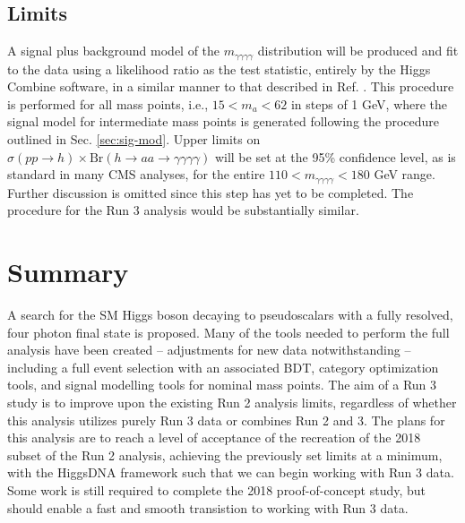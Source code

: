 \documentclass[12pt]{article}
\begin{document}
\subsection{Limits}
A signal plus background model of the $m_{\gamma\gamma\gamma\gamma}$ distribution will be produced and fit to the data using a likelihood ratio as the test statistic, entirely by the Higgs Combine software, in a similar manner to that described in Ref. \cite{higgs-search-2012}. This procedure is performed for all mass points, i.e., $15 < m_{a} < 62$ in steps of 1 GeV, where the signal model for intermediate mass points is generated following the procedure outlined in Sec. \ref{sec:sig-mod}. Upper limits on $\sigma(pp \rightarrow h) \times \mathrm{Br}(h\rightarrow aa \rightarrow \gamma\gamma\gamma\gamma)$ will be set at the 95\% confidence level, as is standard in many CMS analyses, for the entire $110 < m_{\gamma\gamma\gamma\gamma} < 180$ GeV range. Further discussion is omitted since this step has yet to be completed. The procedure for the Run 3 analysis would be substantially similar.\par


\section{Summary}
A search for the SM Higgs boson decaying to pseudoscalars with a fully resolved, four photon final state is proposed. Many of the tools needed to perform the full analysis have been created -- adjustments for new data notwithstanding -- including a full event selection with an associated BDT, category optimization tools, and signal modelling tools for nominal mass points. The aim of a Run 3 study is to improve upon the existing Run 2 analysis limits, regardless of whether this analysis utilizes purely Run 3 data or combines Run 2 and 3. The plans for this analysis are to reach a level of acceptance of the recreation of the 2018 subset of the Run 2 analysis, achieving the previously set limits at a minimum, with the HiggsDNA framework such that we can begin working with Run 3 data. Some work is still required to complete the 2018 proof-of-concept study, but should enable a fast and smooth transistion to working with Run 3 data.\par

\newpage
\printbibliography
\end{document}
